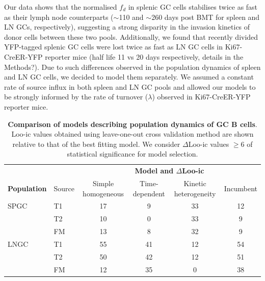 \documentclass[11pt]{article}
\begin{document}
	Our data shows that the normalised $f_{d}$ in splenic GC cells stabilises twice as fast as their lymph node counterparts ($\sim$110 and $\sim$260 days post BMT for spleen and LN GCs, respectively), suggesting a strong disparity in the invasion kinetics of donor cells between these two pools. 
	Additionally, we found that recently divided YFP-tagged splenic GC cells were lost twice as fast as LN GC cells in Ki67-CreER-YFP reporter mice (half life 11 vs 20 days respectively, details in the Methods?).
	Due to such differences observed in the population dynamics of spleen and LN GC cells, we decided to model them separately.
	We assumed a constant rate of source influx in both spleen and LN GC pools and allowed our models to be strongly informed by the rate of turnover ($\lambda$) observed in Ki67-CreER-YFP reporter mice.
	
	
	\begin{table}[h!]
		\begin{center}
			\renewcommand{\arraystretch}{1.25}
			\begin{tabular}{l l c c c c} 
				\toprule 
				&         & \multicolumn{4}{c}{\textbf{Model and $\Delta$Loo-ic}} \\
				\cline{3-6}
				\textbf{Population} & Source     & {\small Simple homogeneous}&  {\small Time-dependent}    & {\small Kinetic heterogeneity} & {\small Incumbent} \\ 
				\toprule
				SPGC &   T1    &   17           &          9            &           33         &          12        \\ 
				     &   T2    &   10           &          0            &           33         &          9         \\ 
				     &   FM    &   13           &          8            &           32         &          9         \\ 
				\hline
				LNGC &   T1    &   55           &          41           &           12         &          54        \\ 
				     &   T2    &   50           &          42           &           12         &          51        \\ 
				     &   FM    &   12           &          35           &           0          &          38        \\ 
				\hline
				\toprule 
			\end{tabular}
		\end{center}
		\caption{\small \textbf{Comparison of models describing population dynamics of GC B cells}. Loo-ic values obtained using leave-one-out cross validation method are shown relative to that of the best fitting model. We consider $\Delta$Loo-ic values $\ge$6 of statistical significance for model selection.} 
		\label{tab:GC-AICs}
	\end{table} 
	
\end{document}
